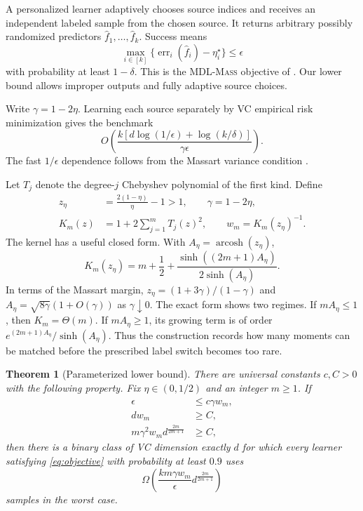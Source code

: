 \documentclass[twoside]{article}
\newtheorem{theorem}{Theorem}
\newcommand{\err}{\operatorname{err}}
\newcommand{\1}{\mathbf 1}
\begin{document}
A personalized learner adaptively chooses source indices and receives an independent labeled sample from the chosen source. It returns arbitrary possibly randomized predictors $\widehat f_1,\ldots,\widehat f_k$. Success means
\begin{equation}
 \max_{i\in[k]}\{\err_i(\widehat f_i)-\eta_i^\star\}\le\epsilon
 \label{eq:objective}
\end{equation}
with probability at least $1-\delta$. This is the \textsc{MDL-Mass} objective of \citet{hanashiro2026bounded}. Our lower bound allows improper outputs and fully adaptive source choices.

Write $\gamma=1-2\eta$. Learning each source separately by VC empirical risk minimization gives the benchmark
\begin{equation}
 O\!\left(
 \frac{k[d\log(1/\epsilon)+\log(k/\delta)]}{\gamma\epsilon}
 \right).
 \label{eq:separate}
\end{equation}
The fast $1/\epsilon$ dependence follows from the Massart variance condition \citep{massart2006risk,boucheron2005classification}.

Let $T_j$ denote the degree-$j$ Chebyshev polynomial of the first kind. Define
\begin{align}
 z_\eta&=\frac{2(1-\eta)}{\eta}-1>1,\qquad
 \gamma=1-2\eta,\label{eq:zeta}\\
 K_m(z)&=1+2\sum_{j=1}^mT_j(z)^2,\qquad
 w_m=K_m(z_\eta)^{-1}.\label{eq:kernel}
\end{align}
The kernel has a useful closed form. With $A_\eta=\operatorname{arcosh}(z_\eta)$,
\begin{equation}
 K_m(z_\eta)=m+\frac12+
 \frac{\sinh((2m+1)A_\eta)}{2\sinh(A_\eta)}.
 \label{eq:kernel-closed}
\end{equation}
In terms of the Massart margin, $z_\eta=(1+3\gamma)/(1-\gamma)$ and $A_\eta=\sqrt{8\gamma}(1+O(\gamma))$ as $\gamma\downarrow0$. The exact form shows two regimes. If $mA_\eta\le1$, then $K_m=\Theta(m)$. If $mA_\eta\ge1$, its growing term is of order $e^{(2m+1)A_\eta}/\sinh(A_\eta)$. Thus the construction records how many moments can be matched before the prescribed label switch becomes too rare.

\begin{theorem}[Parameterized lower bound]
\label{thm:main}
There are universal constants $c,C>0$ with the following property. Fix $\eta\in(0,1/2)$ and an integer $m\ge1$. If
\begin{align}
 \epsilon&\le c\gamma w_m,\label{eq:cond-eps}\\
 dw_m&\ge C,\label{eq:cond-count}\\
 m\gamma^2w_m d^{\frac{2m}{2m+1}}&\ge C,\label{eq:cond-holdout}
\end{align}
then there is a binary class of VC dimension exactly $d$ for which every learner satisfying \eqref{eq:objective} with probability at least $0.9$ uses
\begin{equation}
 \Omega\!\left(
 \frac{k m\gamma w_m}{\epsilon}
 d^{\frac{2m}{2m+1}}
 \right)
 \label{eq:main-bound}
\end{equation}
samples in the worst case.
\end{theorem}
\end{document}
